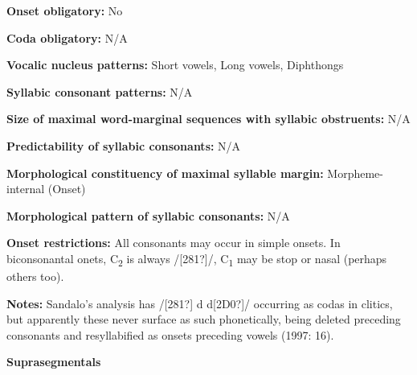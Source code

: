 \begin{styleBody}
\textbf{Onset obligatory: }No
\end{styleBody}

\begin{styleBody}
\textbf{Coda obligatory:} N/A
\end{styleBody}

\begin{styleBody}
\textbf{Vocalic nucleus patterns:} Short vowels, Long vowels, Diphthongs
\end{styleBody}

\begin{styleBody}
\textbf{Syllabic consonant patterns:} N/A
\end{styleBody}

\begin{styleBody}
\textbf{Size of maximal word{}-marginal sequences with syllabic obstruents:} N/A
\end{styleBody}

\begin{styleBody}
\textbf{Predictability of syllabic consonants:} N/A
\end{styleBody}

\begin{styleBody}
\textbf{Morphological constituency of maximal syllable margin:} Morpheme-internal (Onset)
\end{styleBody}

\begin{styleBody}
\textbf{Morphological pattern of syllabic consonants:} N/A
\end{styleBody}

\begin{styleBody}
\textbf{Onset restrictions:} All consonants may occur in simple onsets. In biconsonantal onets, C\textsubscript{2} is always /[281?]/, C\textsubscript{1} may be stop or nasal (perhaps others too).
\end{styleBody}

\begin{styleBody}
\textbf{Notes: }Sandalo’s analysis has /[281?] d d[2D0?]/ occurring as codas in clitics, but apparently these never surface as such phonetically, being deleted preceding consonants and resyllabified as onsets preceding vowels (1997: 16).
\end{styleBody}

\begin{styleBody}
\textbf{Suprasegmentals}
\end{styleBody}

